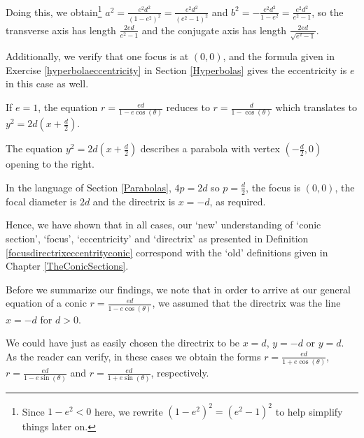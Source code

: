 \documentclass{ximera}
\begin{document}
{ \smallskip
 
Doing this, we obtain\footnote{ Since $1 - e^2 < 0$ here, we rewrite $\left(1-e^2\right)^2 = \left(e^2-1\right)^2$ to help simplify things later on.}  $a^2 = \frac{e^2 d^2}{\left(1-e^2\right)^2} = \frac{e^2d^2}{\left(e^2-1\right)^2}$ and  $b^2 = -\frac{e^2 d^2}{1-e^2} = \frac{e^2d^2}{e^2-1}$, so the transverse axis has length  $\frac{2ed}{e^2-1}$ and the conjugate axis has length $\frac{2ed}{\sqrt{e^2-1}}$.  
 
 \smallskip
 
 Additionally, we verify that one focus is at $(0,0)$, and the formula given in Exercise \ref{hyperbolaeccentricity} in Section \ref{Hyperbolas} gives  the eccentricity is $e$ in this case as well. 
 
 \smallskip
 
 If $e=1$, the equation $r = \frac{ed}{1-e\cos(\theta)}$ reduces to $r = \frac{d}{1-\cos(\theta)}$ which translates to $y^2 = 2d\left(x + \frac{d}{2}\right)$.   
 
 \smallskip
 
The equation $y^2 = 2d\left(x + \frac{d}{2}\right)$ describes a parabola with vertex $\left(-\frac{d}{2}, 0\right)$ opening to the right.  

\smallskip

In the language of Section \ref{Parabolas}, $4p = 2d$ so $p = \frac{d}{2}$, the focus is $(0,0)$, the focal diameter is $2d$ and the directrix is $x = -d$, as required. 

\smallskip

 Hence, we have shown that in all cases, our `new' understanding  of `conic section', `focus', `eccentricity' and `directrix' as presented in Definition \ref{focusdirectrixeccentrityconic} correspond with the `old' definitions given in Chapter \ref{TheConicSections}. 
 
\smallskip

Before we summarize our findings, we note that in order to arrive at our general equation of a conic $r = \frac{ed}{1-e\cos(\theta)}$, we assumed that the directrix was the line $x = -d$ for $d > 0$. 

\smallskip

 We could have just as easily chosen the directrix to be $x = d$, $y = -d$ or $y = d$.  As the reader can verify, in these cases we obtain the forms  $r = \frac{ed}{1+e\cos(\theta)}$,  $r = \frac{ed}{1-e\sin(\theta)}$ and  $r = \frac{ed}{1+e\sin(\theta)}$, respectively. 
 
 \smallskip
 
}
\end{document}
